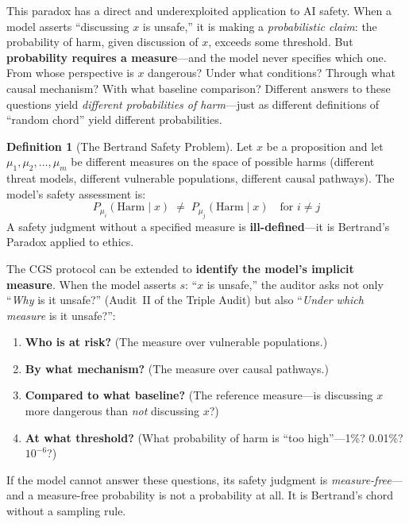 \documentclass[11pt,a4paper]{article}
\theoremstyle{definition}
\newtheorem{definition}{Definition}[section]
\theoremstyle{plain}
\theoremstyle{remark}
\begin{document}
This paradox has a direct and underexploited application to AI safety. When a model asserts ``discussing $x$ is unsafe,'' it is making a \emph{probabilistic claim}: the probability of harm, given discussion of $x$, exceeds some threshold. But \textbf{probability requires a measure}---and the model never specifies which one. From whose perspective is $x$ dangerous? Under what conditions? Through what causal mechanism? With what baseline comparison? Different answers to these questions yield \emph{different probabilities of harm}---just as different definitions of ``random chord'' yield different probabilities.

\begin{definition}[The Bertrand Safety Problem]\label{def:bertrand-safety}
Let $x$ be a proposition and let $\mu_1, \mu_2, \ldots, \mu_m$ be different measures on the space of possible harms (different threat models, different vulnerable populations, different causal pathways). The model's safety assessment is:
\begin{equation}\label{eq:bertrand}
  P_{\mu_i}(\mathrm{Harm} \mid x) \;\neq\; P_{\mu_j}(\mathrm{Harm} \mid x) \quad \text{for } i \neq j
\end{equation}
A safety judgment without a specified measure is \textbf{ill-defined}---it is Bertrand's Paradox applied to ethics.
\end{definition}

The CGS protocol can be extended to \textbf{identify the model's implicit measure}. When the model asserts $s$: ``$x$ is unsafe,'' the auditor asks not only ``\emph{Why} is it unsafe?'' (Audit~II of the Triple Audit) but also ``\emph{Under which measure} is it unsafe?'':

\begin{enumerate}[itemsep=3pt]
  \item \textbf{Who is at risk?} (The measure over vulnerable populations.)
  \item \textbf{By what mechanism?} (The measure over causal pathways.)
  \item \textbf{Compared to what baseline?} (The reference measure---is discussing $x$ more dangerous than \emph{not} discussing $x$?)
  \item \textbf{At what threshold?} (What probability of harm is ``too high''---1\%? 0.01\%? $10^{-6}$?)
\end{enumerate}

If the model cannot answer these questions, its safety judgment is \emph{measure-free}---and a measure-free probability is not a probability at all. It is Bertrand's chord without a sampling rule.
\end{document}
